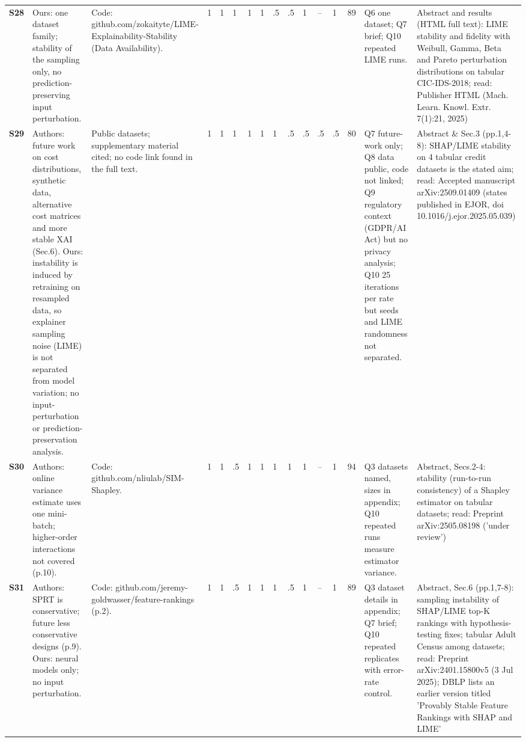 \begin{longtable}{@{}P{1.0cm}P{4.6cm}P{3.6cm}P{0.3cm}P{0.3cm}P{0.3cm}P{0.3cm}P{0.3cm}P{0.3cm}P{0.3cm}P{0.3cm}P{0.3cm}P{0.36cm}P{0.75cm}P{3.0cm}P{3.9cm}@{}}
\textbf{S28} & Ours: one dataset family; stability of the sampling only, no prediction-preserving input perturbation. & Code: github.com/\allowbreak{}zokaityte/\allowbreak{}LIME-Explainability-Stability (Data Availability). & 1 & 1 & 1 & 1 & 1 & .5 & .5 & 1 & -- & 1 & 89 & Q6 one dataset; Q7 brief; Q10 repeated LIME runs. & Abstract and results (HTML full text): LIME stability and fidelity with Weibull, Gamma, Beta and Pareto perturbation distributions on tabular CIC-IDS-2018; read: Publisher HTML (Mach. Learn. Knowl. Extr. 7(1):21, 2025) \\
\textbf{S29} & Authors: future work on cost distributions, synthetic data, alternative cost matrices and more stable XAI (Sec.6). Ours: instability is induced by retraining on resampled data, so explainer sampling noise (LIME) is not separated from model variation; no input-perturbation or prediction-preservation analysis. & Public datasets; supplementary material cited; no code link found in the full text. & 1 & 1 & 1 & 1 & 1 & 1 & .5 & .5 & .5 & .5 & 80 & Q7 future-work only; Q8 data public, code not linked; Q9 regulatory context (GDPR/\allowbreak{}AI Act) but no privacy analysis; Q10 25 iterations per rate but seeds and LIME randomness not separated. & Abstract \& Sec.3 (pp.1,4-8): SHAP/\allowbreak{}LIME stability on 4 tabular credit datasets is the stated aim; read: Accepted manuscript arXiv:2509.01409 (states published in EJOR, doi 10.1016/\allowbreak{}j.ejor.2025.05.039) \\
\textbf{S30} & Authors: online variance estimate uses one mini-batch; higher-order interactions not covered (p.10). & Code: github.com/\allowbreak{}nliulab/\allowbreak{}SIM-Shapley. & 1 & 1 & .5 & 1 & 1 & 1 & 1 & 1 & -- & 1 & 94 & Q3 datasets named, sizes in appendix; Q10 repeated runs measure estimator variance. & Abstract, Secs.2-4: stability (run-to-run consistency) of a Shapley estimator on tabular datasets; read: Preprint arXiv:2505.08198 ('under review') \\
\textbf{S31} & Authors: SPRT is conservative; future less conservative designs (p.9). Ours: neural models only; no input perturbation. & Code: github.com/\allowbreak{}jeremy-goldwasser/\allowbreak{}feature-rankings (p.2). & 1 & 1 & .5 & 1 & 1 & 1 & .5 & 1 & -- & 1 & 89 & Q3 dataset details in appendix; Q7 brief; Q10 repeated replicates with error-rate control. & Abstract, Sec.6 (pp.1,7-8): sampling instability of SHAP/\allowbreak{}LIME top-K rankings with hypothesis-testing fixes; tabular Adult Census among datasets; read: Preprint arXiv:2401.15800v5 (3 Jul 2025); DBLP lists an earlier version titled 'Provably Stable Feature Rankings with SHAP and LIME' \\

\end{longtable}
